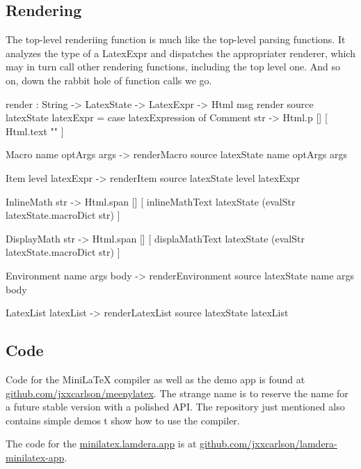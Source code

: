 \subsection{Rendering}


The top-level renderiing function is much like the top-level parsing functions. It analyzes the type of a LatexExpr and dispatches the appropriater renderer, which may in turn call other rendering functions, including the top level one. And so on, down the rabbit hole of function calls we go.


\begin{listing}
render : String -> LatexState -> LatexExpr -> Html msg
render source latexState latexExpr =
    case latexExpression of
        Comment str ->
            Html.p [] [ Html.text "" ]

        Macro name optArgs args ->
            renderMacro source latexState name optArgs args

        Item level latexExpr ->
            renderItem source latexState level latexExpr

        InlineMath str ->
            Html.span [] [
              inlineMathText
                latexState
               (evalStr  latexState.macroDict str) ]

        DisplayMath str ->
            Html.span [] [
              displaMathText
                latexState
               (evalStr  latexState.macroDict str) ]

        Environment name args body ->
            renderEnvironment source latexState name args body

        LatexList latexList ->
            renderLatexList source latexState latexList
\end{listing}

\subsection{Code}

Code for the MiniLaTeX compiler as well as the demo app is found at \href{https://github.com/jxxcarlson/meenylatex}{github.com/jxxcarlson/meenylatex}.  The strange name is to reserve the name  for a future stable version with a polished API.  The repository just mentioned also contains simple demos t show how to use the compiler.

The code for the \href{https://minilatex.lamdera.app}{minilatex.lamdera.app} is at \href{https://github.com/jxxcarlson/lamdera-minilatex-app}{github.com/jxxcarlson/lamdera-minilatex-app}.


